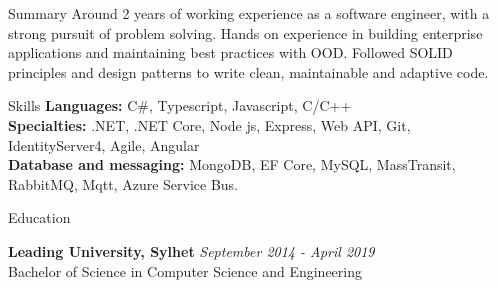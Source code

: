 \documentclass{resume}
\begin{document}

\begin{rSection}{Summary}
Around 2 years of working experience as a software engineer, with a strong pursuit of problem solving.
Hands on experience in building enterprise applications and maintaining best practices with OOD.
Followed SOLID principles and design patterns to write clean, maintainable and adaptive code.
\end{rSection}


\begin{rSection}{Skills}
{\bf Languages:} C\#, Typescript, Javascript, C/C++\\
{\bf Specialties:} .NET, .NET Core, Node js, Express, Web API, Git, IdentityServer4, Agile, Angular\\
{\bf Database and messaging:} MongoDB, EF Core, MySQL, MassTransit, RabbitMQ, Mqtt, Azure Service Bus.
\end{rSection}


\begin{rSection}{Education}

{\bf Leading University, Sylhet} \hfill {\em September 2014 - April 2019}
\\ Bachelor of Science in Computer Science and Engineering
\end{rSection}

\end{document}
